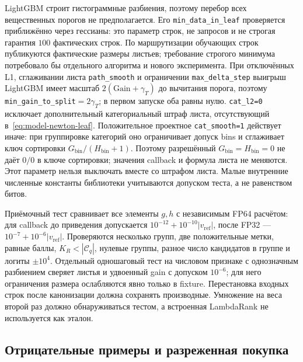 \documentclass[12pt,a4paper]{article}
\newcommand{\code}[1]{{\ttfamily\small\nolinkurl{#1}}}
\theoremstyle{plainru}
\begin{document}
LightGBM строит гистограммные разбиения, поэтому перебор всех
вещественных порогов не предполагается. Его \code{min\_data\_in\_leaf}
проверяется приближённо через гессианы: это параметр строк,
не запросов и не строгая гарантия $100$ фактических строк.
По маршрутизации обучающих строк публикуются фактические размеры
листьев; требование строгого минимума потребовало бы отдельного
алгоритма и нового эксперимента. При отключённых L1, сглаживании
листа \code{path_smooth} и ограничении \code{max_delta_step}
выигрыш LightGBM имеет масштаб
$2(\mathrm{Gain}+\gamma_T)$ до вычитания порога, поэтому
\code{min\_gain\_to\_split}$=2\gamma_T$; в первом запуске оба равны
нулю. \code{cat_l2=0} исключает дополнительный категориальный штраф
листа, отсутствующий в~\eqref{eq:model-newton-leaf}.
Положительное проектное \code{cat_smooth=1} действует иначе:
при группировке категорий оно ограничивает допуск bins и сглаживает
ключ сортировки $G_{\mathrm{bin}}/(H_{\mathrm{bin}}+1)$.
Поэтому разрешённый $G_{\mathrm{bin}}=H_{\mathrm{bin}}=0$ не даёт
$0/0$ в ключе сортировки; значения callback и формула листа не меняются.
Этот параметр нельзя выключать вместе со штрафом листа.
Малые внутренние численные константы
библиотеки учитываются допуском теста, а не равенством битов.

Приёмочный тест сравнивает все элементы $g,h$ с независимым FP64
расчётом: для callback до приведения допускается
$10^{-12}+10^{-10}|v_{\mathrm{ref}}|$, после FP32 ---
$10^{-7}+10^{-6}|v_{\mathrm{ref}}|$. Проверяются несколько групп,
две положительные метки, равные баллы, $K_R<|\mathcal C_q|$,
нулевые группы, разное число кандидатов в группе и логиты $\pm10^4$.
Отдельный одношаговый тест на числовом признаке с однозначным
разбиением сверяет листья и удвоенный gain с допуском $10^{-6}$;
для него ограничения размера ослабляются явно только в fixture.
Перестановка входных строк после канонизации должна сохранять
производные. Умножение на веса второй раз должно обнаруживаться
тестом, а встроенная LambdaRank не используется как эталон.

\subsection{Отрицательные примеры и разреженная покупка}
\end{document}
